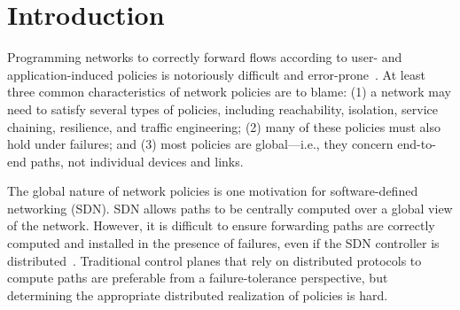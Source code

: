 \section{Introduction}
\label{sec:intro}


Programming networks to correctly forward flows according to user- and
application-induced policies is notoriously difficult and
error-prone~\cite{troubleshooting, bgpmisconfig}. At least three common characteristics of
network policies are to blame: (1) a network may need to satisfy several
types of policies, including reachability, isolation, service
chaining, resilience, and traffic engineering; (2) many of these policies must
also hold under failures; and (3) most policies are global---i.e., they
concern end-to-end paths, not individual devices and links.


The global nature of network policies is one motivation for software-defined
networking (SDN). SDN allows paths to be centrally computed over a global view
of the network. However, it is difficult to ensure forwarding paths are
correctly computed and installed in the presence of failures, even if the SDN
controller is distributed~\cite{hasdn}.
Traditional control planes that rely on distributed protocols to
compute paths are preferable from a failure-tolerance perspective, but
determining the appropriate distributed realization of policies is hard.
   



